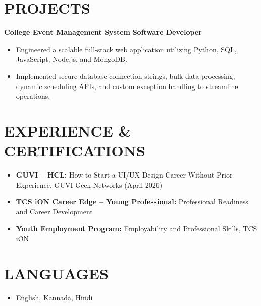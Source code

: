 \documentclass[10pt,letterpaper]{article}
\begin{document}
\section*{PROJECTS}
\noindent\textbf{College Event Management System} \hfill \textbf{Software Developer}
\begin{itemize}
    \item Engineered a scalable full-stack web application utilizing Python, SQL, JavaScript, Node.js, and MongoDB.
    \item Implemented secure database connection strings, bulk data processing, dynamic scheduling APIs, and custom exception handling to streamline operations.
\end{itemize}

\section*{EXPERIENCE \& CERTIFICATIONS}
\begin{itemize}
    \item \textbf{GUVI -- HCL:} How to Start a UI/UX Design Career Without Prior Experience, GUVI Geek Networks (April 2026)
    \item \textbf{TCS iON Career Edge -- Young Professional:} Professional Readiness and Career Development
    \item \textbf{Youth Employment Program:} Employability and Professional Skills, TCS iON
\end{itemize}

\section*{LANGUAGES}
\begin{itemize}
    \item English, Kannada, Hindi
\end{itemize}
\end{document}
